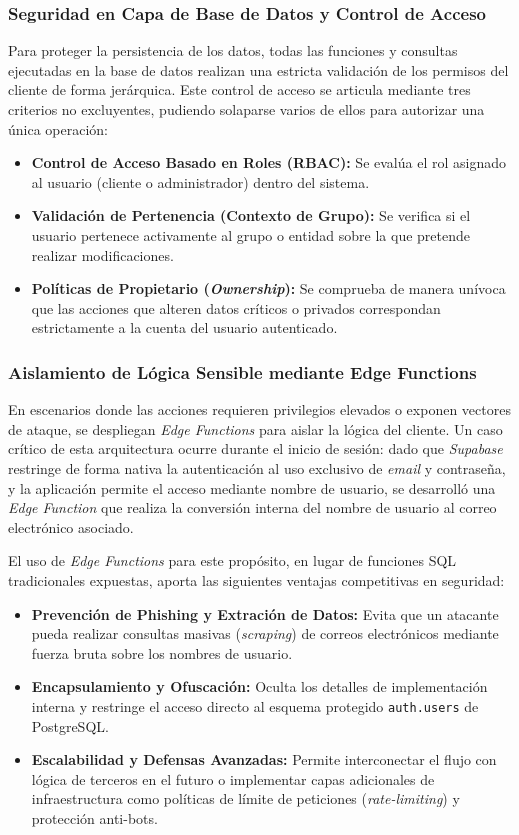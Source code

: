 \subsubsection{Seguridad en Capa de Base de Datos y Control de Acceso}
Para proteger la persistencia de los datos, todas las funciones y consultas ejecutadas en la base de datos realizan una estricta validación de los permisos del cliente de forma jerárquica. Este control de acceso se articula mediante tres criterios no excluyentes, pudiendo solaparse varios de ellos para autorizar una única operación:
\begin{itemize}
    \item \textbf{Control de Acceso Basado en Roles (RBAC):} Se evalúa el rol asignado al usuario (cliente o administrador) dentro del sistema.
    \item \textbf{Validación de Pertenencia (Contexto de Grupo):} Se verifica si el usuario pertenece activamente al grupo o entidad sobre la que pretende realizar modificaciones.
    \item \textbf{Políticas de Propietario (\textit{Ownership}):} Se comprueba de manera unívoca que las acciones que alteren datos críticos o privados correspondan estrictamente a la cuenta del usuario autenticado.
\end{itemize}

\subsubsection{Aislamiento de Lógica Sensible mediante Edge Functions}
En escenarios donde las acciones requieren privilegios elevados o exponen vectores de ataque, se despliegan \textit{Edge Functions} para aislar la lógica del cliente. Un caso crítico de esta arquitectura ocurre durante el inicio de sesión: dado que \textit{Supabase} restringe de forma nativa la autenticación al uso exclusivo de \textit{email} y contraseña, y la aplicación permite el acceso mediante nombre de usuario, se desarrolló una \textit{Edge Function} que realiza la conversión interna del nombre de usuario al correo electrónico asociado.

El uso de \textit{Edge Functions} para este propósito, en lugar de funciones SQL tradicionales expuestas, aporta las siguientes ventajas competitivas en seguridad:
\begin{itemize}
    \item \textbf{Prevención de Phishing y Extración de Datos:} Evita que un atacante pueda realizar consultas masivas (\textit{scraping}) de correos electrónicos mediante fuerza bruta sobre los nombres de usuario.
    \item \textbf{Encapsulamiento y Ofuscación:} Oculta los detalles de implementación interna y restringe el acceso directo al esquema protegido \texttt{auth.users} de PostgreSQL.
    \item \textbf{Escalabilidad y Defensas Avanzadas:} Permite interconectar el flujo con lógica de terceros en el futuro o implementar capas adicionales de infraestructura como políticas de límite de peticiones (\textit{rate-limiting}) y protección anti-bots.
\end{itemize}

